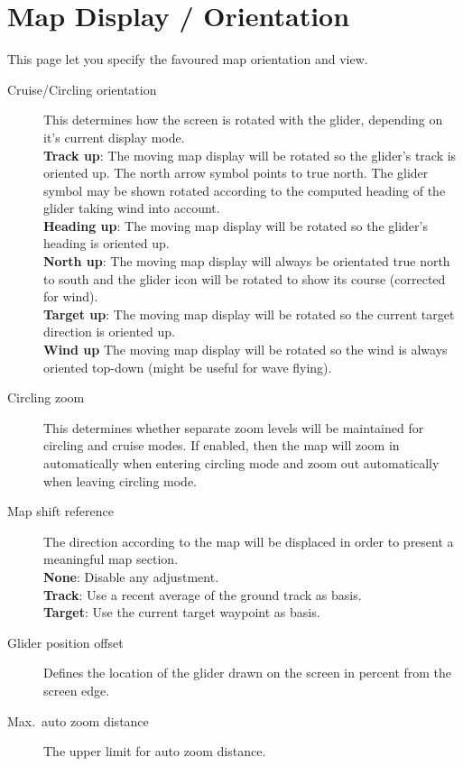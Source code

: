 \section{Map Display / Orientation}\label{sec:map-projection}

This page let you specify the favoured map orientation and view.

\begin{description}
\item[Cruise/Circling orientation]  \label{conf:orientation} This determines how
  the screen is rotated with the glider, depending on it's current display mode. \\
  {\bf Track up}: The moving map display will be rotated so the glider's track
  is oriented up. The north arrow symbol points to true north. The glider symbol 
  may be shown rotated according to the computed heading of the glider taking 
  wind into account. \\
  {\bf Heading up}: The moving map display will be rotated so the glider's 
  heading is oriented up. \\
  {\bf North up}: The moving map display will always be orientated true north to
  south and the glider icon will be rotated to show its course (corrected for
  wind). \\
  {\bf Target up}: The moving map display will be rotated so the current target
  direction is oriented up. \\
  {\bf Wind up} The moving map display will be rotated so the wind is always 
  oriented top-down (might be useful for wave flying).
\item[Circling zoom]  \label{conf:circlingzoom} This determines whether separate
  zoom levels will be maintained for circling and cruise modes.  If enabled, then the 
  map will zoom in automatically when entering circling mode and zoom out
  automatically when leaving circling mode.
\item[Map shift reference]  The direction according to the map will be displaced 
  in order to present a meaningful map section. \\
  {\bf None}: Disable any adjustment. \\
  {\bf Track}: Use a recent average of the ground track as basis. \\
  {\bf Target}: Use the current target waypoint as basis.
\item[Glider position offset]  \label{conf:gliderposition} Defines the location of the 
  glider drawn on the screen in percent from the screen edge.
\item[Max.\ auto zoom distance]  The upper limit for auto zoom distance.
\end{description}


